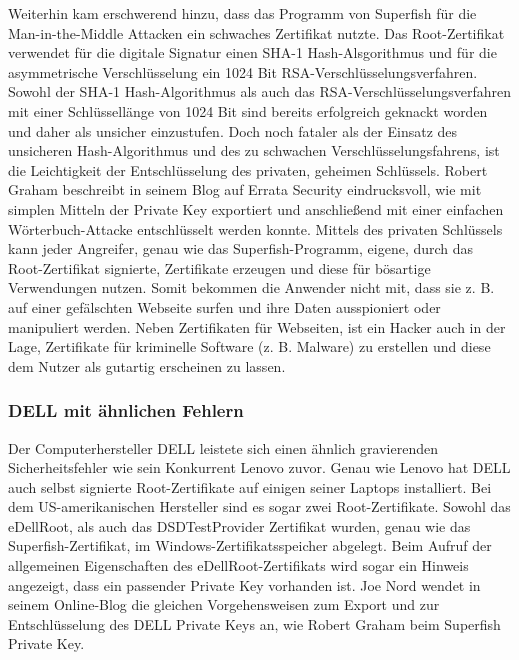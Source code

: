 \noindent %
Weiterhin kam erschwerend hinzu, dass das Programm von Superfish für die Man-in-the-Middle Attacken ein schwaches Zertifikat nutzte. Das Root-Zertifikat verwendet für die digitale Signatur einen SHA-1 Hash-Alsgorithmus und für die asymmetrische Verschlüsselung ein 1024 Bit RSA-Verschlüsselungsverfahren. \cite[vgl.]{lenovo} Sowohl der SHA-1 Hash-Algorithmus als auch das RSA-Verschlüsselungsverfahren mit einer Schlüssellänge von 1024 Bit sind bereits erfolgreich geknackt worden und daher als unsicher einzustufen. \cite[vgl.]{sha-1,rsa}
Doch noch fataler als der Einsatz des unsicheren Hash-Algorithmus und des zu schwachen Verschlüsselungsfahrens, ist die Leichtigkeit der Entschlüsselung des privaten, geheimen Schlüssels. Robert Graham beschreibt in seinem Blog auf Errata Security eindrucksvoll, wie mit simplen Mitteln der Private Key exportiert und anschließend mit einer einfachen Wörterbuch-Attacke entschlüsselt werden konnte. \cite[vgl.]{certificate_ex}
Mittels des privaten Schlüssels kann jeder Angreifer, genau wie das Superfish-Programm, eigene, durch das Root-Zertifikat signierte, Zertifikate erzeugen und diese für bösartige Verwendungen nutzen. Somit bekommen die Anwender nicht mit, dass sie z. B. auf einer gefälschten Webseite surfen und ihre Daten ausspioniert oder manipuliert werden. Neben Zertifikaten für Webseiten, ist ein Hacker auch in der Lage, Zertifikate für kriminelle Software (z. B. Malware) zu erstellen und diese dem Nutzer als gutartig erscheinen zu lassen.  

\subsubsection{DELL mit ähnlichen Fehlern}
Der Computerhersteller DELL leistete sich einen ähnlich gravierenden Sicherheitsfehler wie sein Konkurrent Lenovo zuvor. Genau wie Lenovo hat DELL auch selbst signierte Root-Zertifikate auf einigen seiner Laptops installiert. Bei dem US-amerikanischen Hersteller sind es sogar zwei Root-Zertifikate. Sowohl das eDellRoot, als auch das DSDTestProvider Zertifikat wurden, genau wie das Superfish-Zertifikat, im Windows-Zertifikatsspeicher abgelegt. Beim Aufruf der allgemeinen Eigenschaften des eDellRoot-Zertifikats wird sogar ein Hinweis angezeigt, dass ein passender Private Key vorhanden ist. Joe Nord wendet in seinem Online-Blog die gleichen Vorgehensweisen zum Export und zur Entschlüsselung des DELL Private Keys an, wie Robert Graham beim Superfish Private Key. \cite[vgl.]{dell_joe_nord} 

